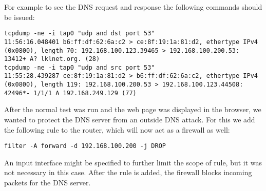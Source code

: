 For example to see the DNS request and response the following commands should be issued:
\lstset{language=zsh, caption=DNS request and respons, label=lst:dnsrr}
\begin{lstlisting}
tcpdump -ne -i tap0 "udp and dst port 53"
11:56:16.048401 b6:ff:df:62:6a:c2 > ce:8f:19:1a:81:d2, ethertype IPv4 (0x0800), length 70: 192.168.100.123.39465 > 192.168.100.200.53: 13412+ A? lklnet.org. (28)
tcpdump -ne -i tap0 "udp and src port 53"
11:55:28.439287 ce:8f:19:1a:81:d2 > b6:ff:df:62:6a:c2, ethertype IPv4 (0x0800), length 119: 192.168.100.200.53 > 192.168.100.123.44508: 42496*- 1/1/1 A 192.168.249.129 (77)
\end{lstlisting}


After the normal test was run and the web page was displayed in the browser, we wanted to protect the DNS server from 
an outside DNS attack. For this we add the following rule to the router, which will now act as a firewall as well:
\lstset{language=zsh, caption=, label=complex-firewall}
\begin{lstlisting}
filter -A forward -d 192.168.100.200 -j DROP
\end{lstlisting}
An input interface might be specified to further limit the scope of rule, but it was not necessary in this case.
After the rule is added, the firewall blocks incoming packets for the DNS server.
